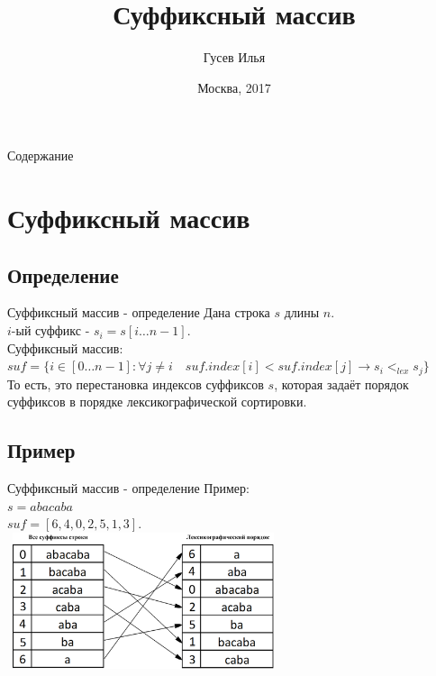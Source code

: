 \documentclass[10pt]{beamer}
\title[\href{https://goo.gl/NRgp8K}{https://goo.gl/NRgp8K} (Term 3)]{Суффиксный массив}
\author[Гусев Илья]{Гусев Илья}
\institute[МФТИ] 
{Московский физико-технический институт\\*}
\date{Москва, 2017}
\begin{document}
\begin{frame}
  \titlepage
\end{frame}

\begin{frame}{Содержание}
\tableofcontents
\end{frame}

\section{Суффиксный массив}

\subsection{Определение}
\begin{frame}[fragile]{Суффиксный массив - определение}
Дана строка $s$ длины $n$.\\ 
$i$-ый суффикс - $s_i=s[i \ldots n-1]$.\\
Суффиксный массив: $suf=\{i \in [0 \ldots n-1] : \forall j \ne i \quad suf.index[i] < suf.index[j] \rightarrow s_{i} <_{lex} s_{j}\}$\\
То есть, это перестановка индексов суффиксов $s$, которая задаёт порядок суффиксов в порядке лексикографической сортировки.
\end{frame}

\subsection{Пример}
\begin{frame}[fragile]{Суффиксный массив - определение}
Пример:\\
$s = abacaba $\\
$suf = [6, 4, 0, 2, 5, 1, 3]$.\\
\includegraphics[width=8cm, height=4cm]{Term_3/Source/Pictures/SuffixArray.png}

\end{frame}
\end{document}
